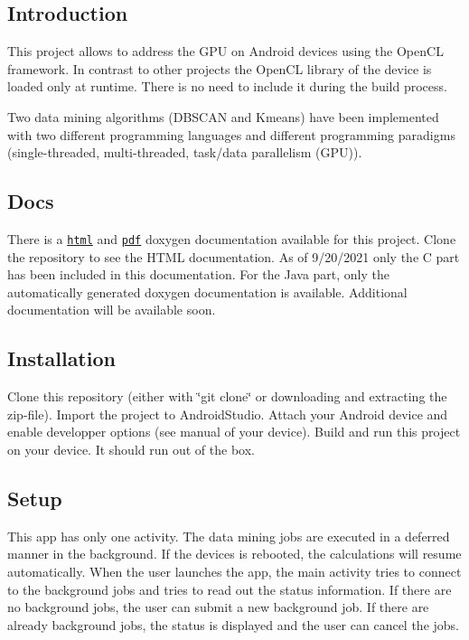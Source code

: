 \subsection*{Introduction}

This project allows to address the G\+PU on Android devices using the Open\+CL framework. In contrast to other projects the Open\+CL library of the device is loaded only at runtime. There is no need to include it during the build process.

Two data mining algorithms (D\+B\+S\+C\+AN and Kmeans) have been implemented with two different programming languages and different programming paradigms (single-\/threaded, multi-\/threaded, task/data parallelism (G\+PU)).

\subsection*{Docs}

There is a \href{app/doc/html/index.html}{\tt html} and \href{app/doc/latex/refman.pdf}{\tt pdf} doxygen documentation available for this project. Clone the repository to see the H\+T\+ML documentation. As of 9/20/2021 only the C part has been included in this documentation. For the Java part, only the automatically generated doxygen documentation is available. Additional documentation will be available soon.

\subsection*{Installation}

Clone this repository (either with \char`\"{}git clone\char`\"{} or downloading and extracting the zip-\/file). Import the project to Android\+Studio. Attach your Android device and enable developper options (see manual of your device). Build and run this project on your device. It should run out of the box.

\subsection*{Setup}

This app has only one activity. The data mining jobs are executed in a deferred manner in the background. If the devices is rebooted, the calculations will resume automatically. When the user launches the app, the main activity tries to connect to the background jobs and tries to read out the status information. If there are no background jobs, the user can submit a new background job. If there are already background jobs, the status is displayed and the user can cancel the jobs.

